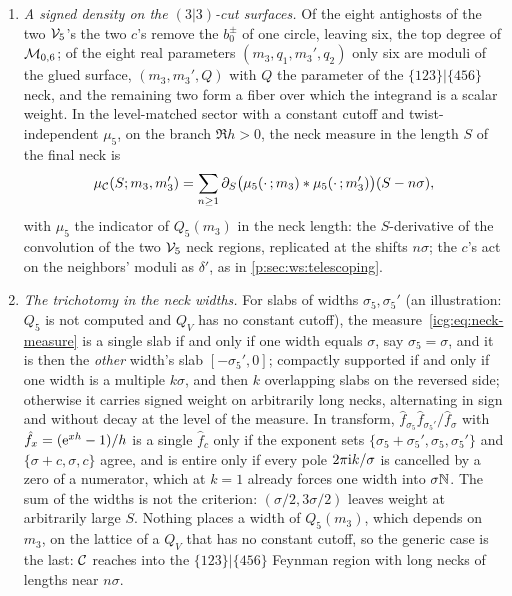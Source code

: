 \begin{enumerate}[leftmargin=*, itemsep=0.3ex]
  \item \emph{A signed density on the $(3|3)$-cut surfaces.}
    Of the eight antighosts of the two ${\mathcal{V}}_5$'s the two $c$'s remove the $b_0^\pm$ of one circle, leaving six, the top degree of ${\mathcal{M}}_{0,6}$; of the eight real parameters $(m_3, q_1, m_3', q_2)$ only six are moduli of the glued surface, $(m_3, m_3', Q)$ with $Q$ the parameter of the $\{123\}|\{456\}$ neck, and the remaining two form a fiber over which the integrand is a scalar weight.
    In the level-matched sector with a constant cutoff and twist-independent $\mu_5$, on the branch $\Re h > 0$, the neck measure in the length $S$ of the final neck is
    \begin{equation}
      \label{icg:eq:neck-measure}
      \mu_{{\mathcal{C}}}(S; m_3, m_3')
        = \sum_{n \ge 1} \partial_S \big( \mu_5(\cdot\,; m_3) * \mu_5(\cdot\,; m_3') \big)(S - n\sigma),
    \end{equation}
    with $\mu_5$ the indicator of $Q_5(m_3)$ in the neck length: the $S$-derivative of the convolution of the two ${\mathcal{V}}_5$ neck regions, replicated at the shifts $n\sigma$; the $c$'s act on the neighbors' moduli as $\delta'$, as in \cref{p:sec:ws:telescoping}.
  \item \emph{The trichotomy in the neck widths.}
    For slabs of widths $\sigma_5, \sigma_5'$ (an illustration: $Q_5$ is not computed and $Q_V$ has no constant cutoff), the measure~\eqref{icg:eq:neck-measure} is a single slab if and only if one width equals $\sigma$, say $\sigma_5 = \sigma$, and it is then the \emph{other} width's slab $[-\sigma_5', 0]$; compactly supported if and only if one width is a multiple $k\sigma$, and then $k$ overlapping slabs on the reversed side; otherwise it carries signed weight on arbitrarily long necks, alternating in sign and without decay at the level of the measure.
    In transform, $\hat f_{\sigma_5} \hat f_{\sigma_5'} / \hat f_\sigma$ with $\hat f_x = (\mathrm{e}^{xh} - 1)/h$ is a single $\hat f_c$ only if the exponent sets $\{\sigma_5 + \sigma_5', \sigma_5, \sigma_5'\}$ and $\{\sigma + c, \sigma, c\}$ agree, and is entire only if every pole $2\pi\mathrm{i} k/\sigma$ is cancelled by a zero of a numerator, which at $k = 1$ already forces one width into $\sigma\mathbb{N}$.
    The sum of the widths is not the criterion: $(\sigma/2, 3\sigma/2)$ leaves weight at arbitrarily large $S$.
    Nothing places a width of $Q_5(m_3)$, which depends on $m_3$, on the lattice of a $Q_V$ that has no constant cutoff, so the generic case is the last: ${\mathcal{C}}$ reaches into the $\{123\}|\{456\}$ Feynman region with long necks of lengths near $n\sigma$.

\end{enumerate}
